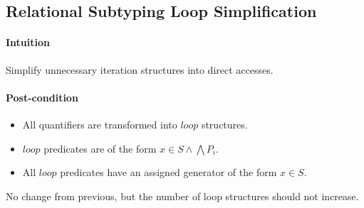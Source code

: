 \documentclass{article}
\begin{document}
\subsection{Relational Subtyping Loop Simplification}

\paragraph{Intuition} Simplify unnecessary iteration structures into direct accesses.

\paragraph{Post-condition}
\begin{itemize}
  \item All quantifiers are transformed into $loop$ structures.
  \item $loop$ predicates are of the form $x \in S \land \bigwedge P_i$.
  \item All $loop$ predicates have an assigned generator of the form $x \in S$.
\end{itemize}
No change from previous, but the number of loop structures should not increase.
\end{document}
